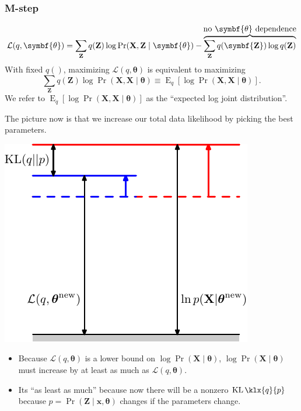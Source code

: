 \documentclass[11pt]{article}
\DeclareMathOperator{\E}{E}
\DeclareMathOperator{\KLsym}{KL}
\newcommand{\KL}{\KLsym\klx}
\begin{document}
\subsubsection*{M-step}
\begin{equation*}
  \mathcal{L}(q, \symbf{\theta}) = \sum_{\mathbf{Z}} q(\mathbf{Z})
    \log \Pr(\mathbf{X}, \mathbf{Z} \mid \symbf{\theta}) -
    \overbrace{\sum_{\mathbf{Z}} q(\symbf{\mathbf{Z}})
        \log q(\mathbf{Z})}^
    {\mathclap{\text{\normalsize no $\symbf{\theta}$ dependence}}}
\end{equation*}
With fixed $q()$, maximizing $\mathcal{L}(q, \symbf{\theta})$ is equivalent to
maximizing
\begin{equation*}
  \sum_{\mathbf{Z}} q(\mathbf{Z}) \log \Pr(\mathbf{X}, \mathbf{X} \mid
      \symbf{\theta}) \equiv \E_q [\log \Pr(\mathbf{X}, \mathbf{X} \mid
          \symbf{\theta})].
\end{equation*}
We refer to $\E_q [\log \Pr(\mathbf{X}, \mathbf{X} \mid \symbf{\theta})]$ as the
``expected log joint distribution''.

The picture now is that we increase our total data likelihood by picking the
best parameters.
\begin{center}
  \includegraphics[scale=1]{Figure9-13.pdf}
\end{center}
\begin{itemize}
  \item Because $\mathcal{L}(q, \symbf{\theta})$ is a lower bound on
  $\log \Pr (\mathbf{X} \mid \symbf{\theta})$,
  $\log \Pr (\mathbf{X} \mid \symbf{\theta})$ must increase by at least as much
  as $\mathcal{L}(q, \symbf{\theta})$.

  \item Its ``as least as much'' because now there will be a nonzero
  $\KL{q}{p}$ because $p = \Pr(\mathbf{Z} \mid \mathbf{x}, \symbf{\theta})$
  changes if the parameters change.
\end{itemize}
\end{document}
